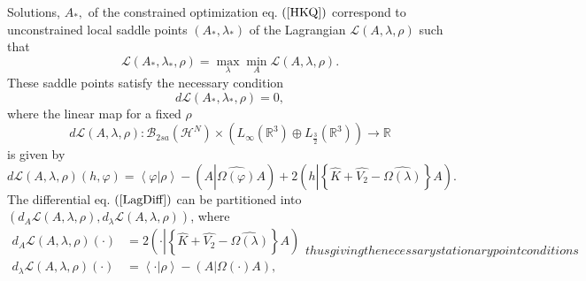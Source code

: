 \documentclass[aps,preprint]{revtex4}%
\begin{document}
Solutions, $A_{\ast},$ of the constrained optimization eq. $\left(
\ref{HKQ}\right)  $ correspond to unconstrained local saddle points $\left(
A_{\ast},\lambda_{\ast}\right)  $ \cite{Hestenes75} of the Lagrangian
$\mathcal{L}\left(  A,\lambda,\rho\right)  $ such that%
\begin{equation}
\mathcal{L}\left(  A_{\ast},\lambda_{\ast},\rho\right)  =\max_{\lambda}%
\min_{A}\mathcal{L}\left(  A,\lambda,\rho\right)  . \label{MinProb}%
\end{equation}
These saddle points satisfy the necessary condition
\begin{equation}
d\mathcal{L}\left(  A_{\ast},\lambda_{\ast},\rho\right)  =0, \label{NecCon}%
\end{equation}
where the linear map for a fixed $\rho$
\begin{equation}
d\mathcal{L}\left(  A,\lambda,\rho\right)  :\mathcal{B}_{2sa}\left(
\mathcal{H}^{N}\right)  \times\left(  L_{\infty}\left(  \mathbb{R}^{3}\right)
\oplus L_{\frac{3}{2}}\left(  \mathbb{R}^{3}\right)  \right)  \rightarrow
\mathbb{R}%
\end{equation}
is given by%
\begin{equation}
d\mathcal{L}\left(  A,\lambda,\rho\right)  \left(  h,\varphi\right)
=\left\langle \varphi\left\vert \rho\right.  \right\rangle -\left(
A\left\vert \widehat{\Omega\left(  \varphi\right)  }\right.  A\right)
+2\left(  h\left\vert \left\{  \widehat{K}+\widehat{V_{2}}-\widehat{\Omega
\left(  \lambda\right)  }\right\}  \right.  A\right)  . \label{LagDiff}%
\end{equation}
The differential eq. $\left(  \ref{LagDiff}\right)  $ can be partitioned into
$\left(  d_{A}\mathcal{L}\left(  A,\lambda,\rho\right)  ,d_{\lambda
}\mathcal{L}\left(  A,\lambda,\rho\right)  \right)  $, where
\begin{subequations}
\label{differential}%
\begin{align}
d_{A}\mathcal{L}\left(  A,\lambda,\rho\right)  \left(  \cdot\right)   &
=2\left(  \cdot\left\vert \left\{  \widehat{K}+\widehat{V_{2}}-\widehat{\Omega
\left(  \lambda\right)  }\right\}  \right.  A\right) \\
d_{\lambda}\mathcal{L}\left(  A,\lambda,\rho\right)  \left(  \cdot\right)   &
=\left\langle \cdot\left\vert \rho\right.  \right\rangle -\left(  A\left\vert
\Omega\left(  \cdot\right)  \right.  A\right)  ,
\end{align}
thus giving the necessary stationary point conditions
\end{subequations}
\end{document}
